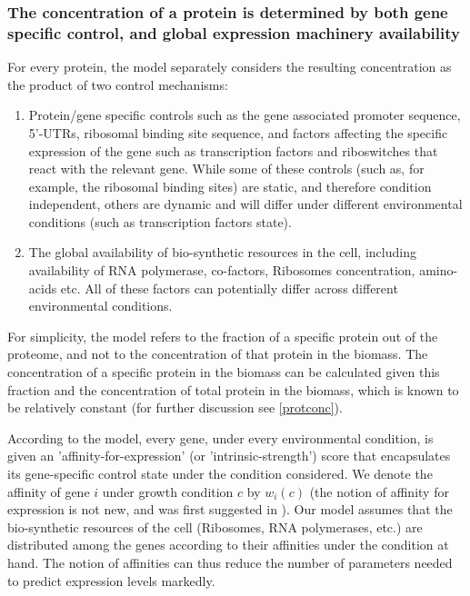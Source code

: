 \documentclass[a4paper]{article}
\begin{document}
\subsubsection{The concentration of a protein is determined by both gene specific control, and global
expression machinery availability}
For every protein, the model separately considers the resulting concentration as the product of two control mechanisms:
\begin{enumerate}
\item Protein/gene specific controls such as the gene associated promoter sequence, 5'-UTRs, ribosomal binding site sequence, and factors affecting the specific expression of the gene such as transcription factors and riboswitches that react with the relevant gene.
  While some of these controls (such as, for example, the ribosomal binding sites) are static, and therefore condition independent, others are dynamic and will differ under different environmental conditions (such as transcription factors state).
\item The global availability of bio-synthetic resources in the cell, including availability of RNA polymerase, co-factors, Ribosomes concentration, amino-acids etc.
  All of these factors can potentially differ across different environmental conditions.
\end{enumerate}

For simplicity, the model refers to the fraction of a specific protein out of the proteome, and not to the concentration of that protein in the biomass.
The concentration of a specific protein in the biomass can be calculated given this fraction and the concentration of total protein in the biomass, which is known to be relatively constant \cite{Bremer1987,Scott2014} (for further discussion see \ref{protconc}).

According to the model, every gene, under every environmental condition, is given an 'affinity-for-expression' (or 'intrinsic-strength') score that encapsulates its gene-specific control state under the condition considered.
We denote the affinity of gene $i$ under growth condition $c$ by $w_i(c)$ (the notion of affinity for expression is not new, and was first suggested in  \cite{Maaloe1969}).
Our model assumes that the bio-synthetic resources of the cell (Ribosomes, RNA polymerases, etc.) are distributed among the genes according to their affinities under the condition at hand.
The notion of affinities can thus reduce the number of parameters needed to predict expression levels
markedly.
\end{document}
